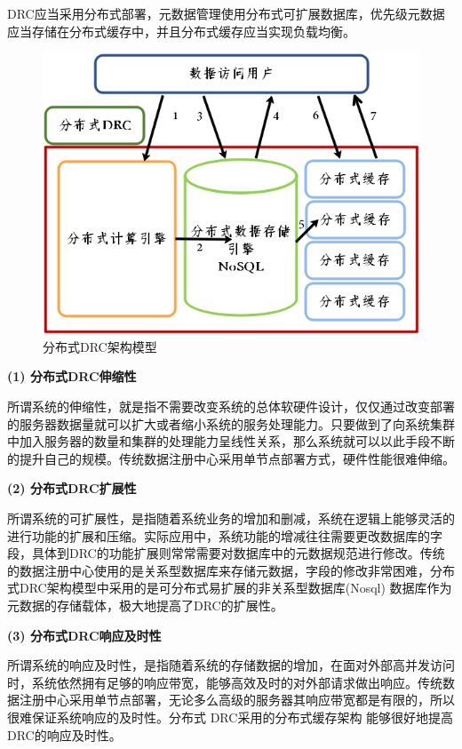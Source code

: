 \documentclass[article]{BJTU-thesis}
\begin{document}
	DRC应当采用分布式部署，元数据管理使用分布式可扩展数据库，优先级元数据应当存储在分布式缓存中，并且分布式缓存应当实现负载均衡\cite{lc}。
	
	\begin{figure}[!htbp]
		\centering
		\includegraphics[scale=0.6]{5.png}
		\caption{分布式DRC架构模型}
		\label{fig:fig5}
	\end{figure}
	
	\noindent\textbf{(1) 分布式DRC伸缩性}
	
	所谓系统的伸缩性，就是指不需要改变系统的总体软硬件设计，仅仅通过改变部署的服务器数据量就可以扩大或者缩小系统的服务处理能力。只要做到了向系统集群中加入服务器的数量和集群的处理能力呈线性关系，那么系统就可以以此手段不断的提升自己的规模。传统数据注册中心采用单节点部署方式，硬件性能很难伸缩。
	\newline
	
	\noindent\textbf{(2) 分布式DRC扩展性}

	所谓系统的可扩展性，是指随着系统业务的增加和删减，系统在逻辑上能够灵活的进行功能的扩展和压缩。实际应用中，系统功能的增减往往需要更改数据库的字段，具体到DRC的功能扩展则常常需要对数据库中的元数据规范进行修改。传统的数据注册中心使用的是关系型数据库来存储元数据，字段的修改非常困难，分布式DRC架构模型中采用的是可分布式易扩展的非关系型数据库(Nosql) 数据库作为元数据的存储载体，极大地提高了DRC的扩展性。
	\newline
	
	\noindent\textbf{(3) 分布式DRC响应及时性}

	所谓系统的响应及时性，是指随着系统的存储数据的增加，在面对外部高并发访问时，系统依然拥有足够的响应带宽，能够高效及时的对外部请求做出响应。传统数据注册中心采用单节点部署，无论多么高级的服务器其响应带宽都是有限的，所以很难保证系统响应的及时性。分布式 DRC采用的分布式缓存架构 能够很好地提高DRC的响应及时性。
	\newline
	
\end{document}
